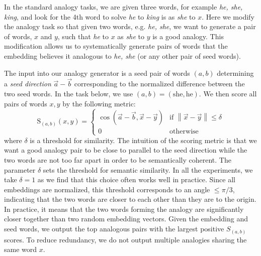 \documentclass{article}
\begin{document}
In the standard analogy tasks, we are given three words, for example \emph{he, she, king}, and look for the 4th word to solve \emph{he} to \emph{king} is as \emph{she} to $x$. Here we modify the analogy task so that given two words, e.g. \emph{he, she}, we want to generate a pair of words, $x$ and $y$, such that \emph{he} to $x$ as \emph{she} to $y$ is a good analogy. This modification allows us to systematically generate pairs of words that the embedding believes it analogous to \emph{he, she} (or any other pair of seed words).

The input into our analogy generator is a seed pair of words $(a,b)$ determining a {\em seed direction} $\vec{a}-\vec{b}$ corresponding to the normalized difference between the two seed words. In the task below, we use $(a,b)=(\text{she}, \text{he})$. We then score all pairs of words $x, y$ by the following metric:
\begin{equation}
\label{eq:analogyS}
\mbox{S}_{(a,b)}(x, y) = \begin{cases}
    \cos\left(\vec{a}-\vec{b}, \vec{x}-\vec{y}\right) & \text{if } \left\|\vec{x}-\vec{y}\right\| \leq \delta\\
    0              & \text{otherwise}
\end{cases}
\end{equation}
where $\delta$ is a threshold for similarity. The intuition of the scoring metric is that we want a good analogy pair to be close to parallel to the seed direction while the two words are not too far apart in order to be semantically coherent. The parameter $\delta$ sets the threshold for semantic similarity. In all the experiments, we take $\delta=1$ as we find that this choice often works well in practice. Since all embeddings are normalized, this threshold corresponds to an angle $\leq \pi/3$, indicating that the two words are closer to each other than they are to the origin. In practice, it means that the two words forming the analogy are significantly closer together than two random embedding vectors.
Given the embedding and seed words, we output the top analogous pairs with the largest positive $S_{(a,b)}$ scores. To reduce redundancy, we do not output multiple analogies sharing the same word $x$.
\end{document}
